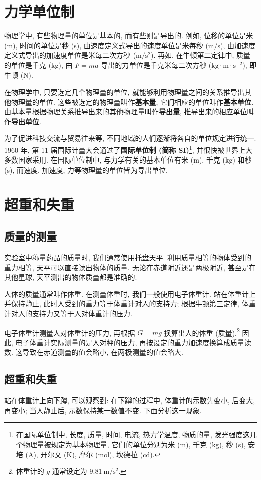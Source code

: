 \documentclass[UTF8,openany,fontset=fandol]{ctexbook}
\theoremstyle{chinesetextbook}
\newcommand{\unit}[1]{\ \mathrm{#1}}
\begin{document}
\section{力学单位制}
物理学中, 有些物理量的单位是基本的, 而有些则是导出的. 例如, 位移的单位是米 (m), 时间的单位是秒 (s), 由速度定义式导出的速度单位是米每秒 (m/s), 由加速度定义式导出的加速度单位是米每二次方秒 ($\mathrm{m/s^2}$). 再如, 在牛顿第二定律中, 质量的单位是千克 (kg), 由 $F=ma$ 导出的力单位是千克米每二次方秒 ($\mathrm{kg\cdot m\cdot s^{-2}}$), 即牛顿 (N).

在物理学中, 只要选定几个物理量的单位, 就能够利用物理量之间的关系推导出其他物理量的单位. 这些被选定的物理量叫作\textbf{基本量}, 它们相应的单位叫作\textbf{基本单位}. 由基本量根据物理关系推导出来的其他物理量叫作\textbf{导出量}, 推导出来的相应单位叫作\textbf{导出单位}.

为了促进科技交流与贸易往来等, 不同地域的人们逐渐将各自的单位规定进行统一. 1960 年, 第 11 届国际计量大会通过了\textbf{国际单位制 (简称 SI)}\footnote{在国际单位制中, 长度, 质量, 时间, 电流, 热力学温度, 物质的量, 发光强度这几个物理量被规定为基本物理量, 它们的单位分别为米 (m), 千克 (kg), 秒 (s), 安培 (A), 开尔文 (K), 摩尔 (mol), 坎德拉 (cd).}, 并很快被世界上大多数国家采用. 在国际单位制中, 与力学有关的基本单位有米 (m), 千克 (kg) 和秒 (s), 而速度, 加速度, 力等物理量的单位皆为导出单位.
\section{超重和失重}
\subsection*{质量的测量}
实验室中称量药品的质量时, 我们通常使用托盘天平. 利用质量相等的物体受到的重力相等, 天平可以直接读出物体的质量. 无论在赤道附近还是两极附近, 甚至是在其他星球, 天平测出的物体质量都是准确的.

人体的质量通常叫作体重. 在测量体重时, 我们一般使用电子体重计. 站在体重计上并保持静止, 此时人受到的重力等于体重计对人的支持力; 根据牛顿第三定律, 体重计对人的支持力又等于人对体重计的压力.

电子体重计测量人对体重计的压力, 再根据 $G=mg$ 换算出人的体重 (质量).\footnote{体重计的 $g$ 通常设定为 $9.81\unit{m/s^2}$.} 因此, 电子体重计实际测量的是人对秤的压力, 再按设定的重力加速度换算成质量读数. 这导致在赤道测量的值会略小, 在两极测量的值会略大.
\subsection*{超重和失重}
站在体重计上向下蹲, 可以观察到: 在下蹲的过程中, 体重计的示数先变小, 后变大, 再变小; 当人静止后, 示数保持某一数值不变. 下面分析这一现象.
\end{document}
